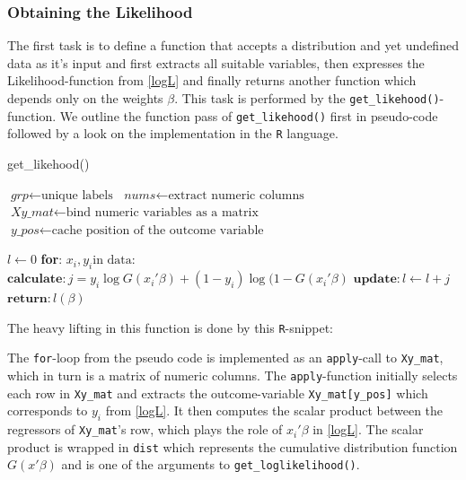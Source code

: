 \documentclass{article}
\begin{document}
\subsubsection{Obtaining the Likelihood}

The first task is to define a function that accepts a distribution and yet undefined data as it's input and first extracts all suitable variables, then expresses the Likelihood-function from \ref{logL} and finally returns another function which depends only on the weights $\beta$. This task is performed by the \texttt{get\_likehood()}-function. We outline the function pass of \texttt{get\_likehood()} first in pseudo-code followed by a look on the implementation in the \texttt{R} language.

\begin{algorithm}
\caption{get\_likehood()}\label{getllog}
\begin{algorithmic}[1]
\State $\textit{grp} \gets \text{unique labels}$
\State $\textit{nums} \gets \text{extract numeric columns}$
\State $\textit{Xy\_mat} \gets \text{bind numeric variables as a matrix}$
\State $\textit{y\_pos} \gets \text{cache position of the outcome variable}$
\EndProcedure

\State $\textit{l} \gets 0$
\State \textbf{for}: $x_i, y_i \text{in data}:$
\State \qquad $\textbf{calculate}: j = y_i \log G(x_i\prime \beta) +
               (1-y_i) \log (1-G(x_i\prime \beta)$
\State \qquad $\textbf{update}: l \gets l + j$
\State $\textbf{return}: l(\beta)$
\EndProcedure
\end{algorithmic}
\end{algorithm}

The heavy lifting in this function is done by this \texttt{R}-snippet:


The \texttt{for}-loop from the pseudo code is implemented as an \texttt{apply}-call to \texttt{Xy\_mat}, which in turn is a matrix of numeric columns. The \texttt{apply}-function initially selects each row in \texttt{Xy\_mat} and extracts the outcome-variable \texttt{Xy\_mat[y\_pos]} which corresponds to $y_i$ from \ref{logL}. It then computes the scalar product between the regressors of \texttt{Xy\_mat}'s row, which plays the role of $x_i \prime \beta$ in \ref{logL}. The scalar product is wrapped in \texttt{dist} which represents the cumulative distribution function $G(x\prime\beta)$ and is one of the arguments to \texttt{get\_loglikelihood()}.
\end{document}
